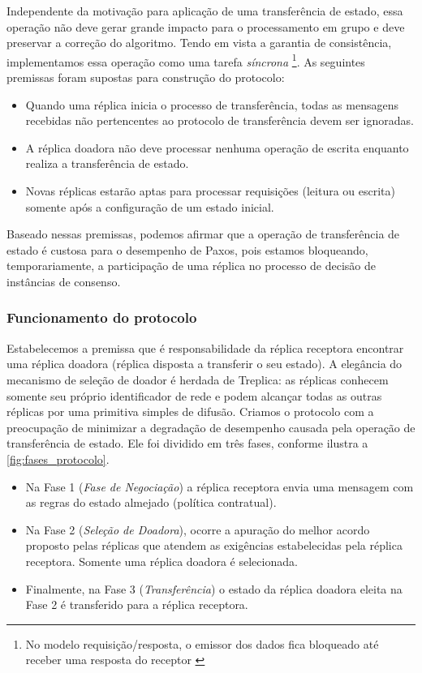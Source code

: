 Independente da motivação para aplicação de uma transferência de estado, essa operação
não deve gerar grande impacto para o processamento em grupo e deve preservar a correção do
algoritmo. Tendo em vista a garantia de consistência, implementamos essa operação como uma
tarefa \emph{síncrona} \footnote{No modelo requisição/resposta, o emissor dos dados fica
bloqueado até receber uma resposta do receptor \cite{coulouris11}}. As seguintes premissas
foram supostas para construção do protocolo:

\begin{itemize}
  \item Quando uma réplica inicia o processo de transferência, todas as mensagens
    recebidas não pertencentes ao protocolo de transferência devem ser ignoradas.
  \item A réplica doadora não deve processar nenhuma operação de escrita enquanto realiza
    a transferência de estado.
  \item Novas réplicas estarão aptas para processar requisições (leitura ou escrita)
    somente após a configuração de um estado inicial.
\end{itemize}

Baseado nessas premissas, podemos afirmar que a operação de transferência de estado é
custosa para o desempenho de Paxos, pois estamos bloqueando, temporariamente, a
participação de uma réplica no processo de decisão de instâncias de consenso.

\subsubsection{Funcionamento do protocolo}

Estabelecemos a premissa que é responsabilidade da réplica receptora encontrar uma réplica
doadora (réplica disposta a transferir o seu estado). A elegância do mecanismo de seleção
de doador é herdada de Treplica: as réplicas conhecem somente seu próprio identificador de
rede e podem alcançar todas as outras réplicas por uma primitiva simples de difusão.
Criamos o protocolo com a preocupação de minimizar a degradação de desempenho causada pela
operação de transferência de estado. Ele foi dividido em três fases, conforme ilustra a
\autoref{fig:fases_protocolo}.

\begin{itemize}
  \item Na Fase 1 (\emph{Fase de Negociação}) a réplica receptora envia uma mensagem com
    as regras do estado almejado (política contratual).
  \item Na Fase 2 (\emph{Seleção de Doadora}), ocorre a apuração do melhor acordo proposto
    pelas réplicas que atendem as exigências estabelecidas pela réplica receptora. Somente
    uma réplica doadora é selecionada.
  \item Finalmente, na Fase 3 (\emph{Transferência}) o estado da réplica doadora eleita na
    Fase 2 é transferido para a réplica receptora.
\end{itemize}

